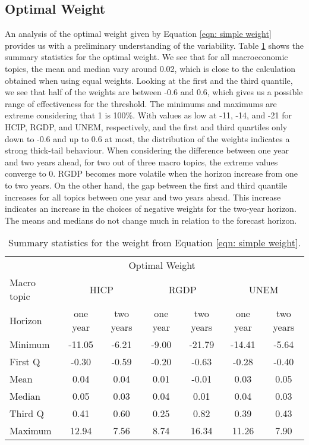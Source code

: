 \documentclass[11pt]{article}
\begin{document}
	\subsection{Optimal Weight}\label{optimal-weight}
	An analysis of the optimal weight given by Equation \ref{eqn: simple weight} provides us with a preliminary understanding of the variability. Table \ref{tab: simple weight summary statistics} shows the summary statistics for the optimal weight. We see that for all macroeconomic topics, the mean and median vary around 0.02, which is close to the calculation obtained when using equal weights. Looking at the first and the third quantile, we see that half of the weights are between -0.6 and 0.6, which gives us a possible range of effectiveness for the threshold. The minimums and maximums are extreme considering that 1 is 100\%. With values as low at -11, -14, and -21 for HCIP, RGDP, and UNEM, respectively, and the first and third quartiles only down to -0.6 and up to 0.6 at most, the distribution of the weights indicates a strong thick-tail behaviour. When considering the difference between one year and two years ahead, for two out of three macro topics, the extreme values converge to 0. RGDP becomes more volatile when the horizon increase from one to two years. On the other hand, the gap between the first and third quantile increases for all topics between one year and two years ahead. This increase indicates an increase in the choices of negative weights for the two-year horizon. The means and medians do not change much in relation to the forecast horizon.
	
	\begin{table}[!h]
		\centering
		\caption{Summary statistics for the weight from Equation \ref{eqn: simple weight}.}
		\label{tab: simple weight summary statistics}
		\begin{tabular}{lcccccc}%
			\hline
			&\multicolumn{5}{c}{Optimal Weight}\\
			\cmidrule(lr){2-7}
			Macro topic & \multicolumn{2}{c}{HICP} & \multicolumn{2}{c}{RGDP} & \multicolumn{2}{c}{UNEM} \\
			\cmidrule(lr){2-3} \cmidrule(lr){4-5}\cmidrule(lr){6-7}
			Horizon     & one year & two years & one year & two years & one year & two years \\ 
			\hline
			Minimum      & -11.05      & -6.21      & -9.00      & -21.79      & -14.41      & -5.64      \\
			First Q      & -0.30       & -0.59      & -0.20      & -0.63       & -0.28       & -0.40      \\
			Mean         & 0.04        & 0.04       & 0.01       & -0.01       & 0.03        & 0.05       \\
			Median       & 0.05        & 0.03       & 0.04       & 0.01        & 0.04        & 0.03       \\
			Third Q      & 0.41        & 0.60       & 0.25       & 0.82        & 0.39        & 0.43       \\
			Maximum      & 12.94       & 7.56       & 8.74       & 16.34       & 11.26       & 7.90       \\ 
			\hline
		\end{tabular}
	\end{table}
	
\end{document}

